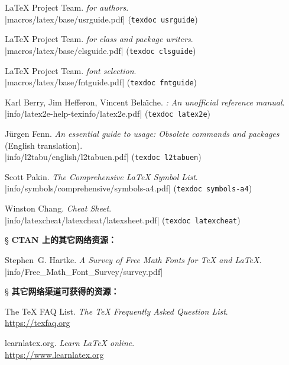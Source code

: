 \begin{thebibliography}{20}
 \LaTeX{} Project Team.
  \newblock \emph{\LaTeXe{} for authors}.\\
  \CTAN|macros/latex/base/usrguide.pdf| (\texttt{texdoc usrguide})

 \LaTeX{} Project Team.
  \newblock \emph{\LaTeXe{} for class and package writers}. \\
  \CTAN|macros/latex/base/clsguide.pdf| (\texttt{texdoc clsguide})

 \LaTeX{} Project Team.
  \newblock \emph{\LaTeXe{} font selection}. \\
  \CTAN|macros/latex/base/fntguide.pdf| (\texttt{texdoc fntguide})

 Karl Berry, Jim Hefferon, Vincent Bela\"{\i}che.
  \newblock \emph{\LaTeXe: An unofficial reference manual}. \\
  \CTAN|info/latex2e-help-texinfo/latex2e.pdf| (\texttt{texdoc latex2e})

 J\"{u}rgen Fenn.
  \newblock \emph{An essential guide to \LaTeXe{} usage: Obsolete commands and packages} (English translation). \\
  \CTAN|info/l2tabu/english/l2tabuen.pdf| (\texttt{texdoc l2tabuen})

 Scott Pakin.
  \newblock \emph{The Comprehensive \LaTeX{} Symbol List}. \\
  \CTAN|info/symbols/comprehensive/symbols-a4.pdf| (\texttt{texdoc symbols-a4})

 Winston Chang.
  \newblock \emph{\LaTeXe{} Cheat Sheet}. \\
  \CTAN|info/latexcheat/latexcheat/latexsheet.pdf| (\texttt{texdoc latexcheat})

\item[\S] {\bfseries CTAN 上的其它网络资源：}

 Stephen~G. Hartke.
  \newblock \emph{A Survey of Free Math Fonts for \TeX{} and \LaTeX}.\\
  \CTAN|info/Free_Math_Font_Survey/survey.pdf|

\item[\S] {\bfseries 其它网络渠道可获得的资源：}

 The \TeX{} FAQ List.
  \newblock \emph{The \TeX{} Frequently Asked Question List}. \\
  \url{https://texfaq.org}

 learnlatex.org.
  \newblock \emph{Learn \LaTeX{} online}. \\
  \url{https://www.learnlatex.org}


\end{thebibliography}
